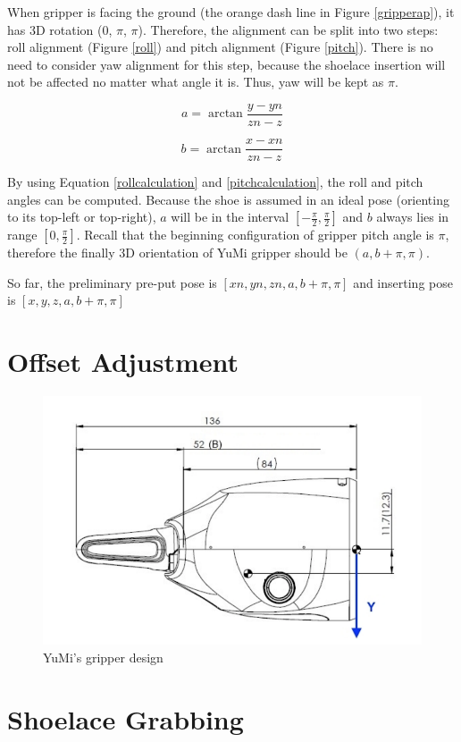 When gripper is facing the ground (the orange dash line in Figure \ref{gripperap}), it has 3D rotation (0, $\pi$, $\pi$). Therefore, the alignment can be split into two steps: roll alignment (Figure \ref{roll}) and pitch alignment (Figure \ref{pitch}). There is no need to consider yaw alignment for this step, because the shoelace insertion will not be affected no matter what angle it is. Thus, yaw will be kept as $\pi$.

\begin{equation}
a = \arctan \frac{y - yn}{zn - z}
\label{rollcalculation}
\end{equation}

\begin{equation}
b = \arctan \frac{x - xn}{zn - z}
\label{pitchcalculation}
\end{equation}

By using Equation \ref{rollcalculation} and \ref{pitchcalculation}, the roll and pitch angles can be computed. Because the shoe is assumed in an ideal pose (orienting to its top-left or top-right), $a$ will be in the interval $[-\frac{\pi}{2}, \frac{\pi}{2}]$ and $b$ always lies in range $[0, \frac{\pi}{2}]$. Recall that the beginning configuration of gripper pitch angle is $\pi$, therefore the finally 3D orientation of YuMi gripper should be $(a, b + \pi, \pi)$. 

So far, the preliminary pre-put pose is $[xn, yn, zn, a, b + \pi, \pi]$ and inserting pose is $[x, y, z, a, b + \pi, \pi]$

\section{Offset Adjustment}

\begin{figure}[H]
\centering
\includegraphics[width = 0.5\columnwidth]{Implementation/mp/gripperoffset.png}
\caption{YuMi's gripper design \citep{Productspecification}}
\label{gripperoffset}
\end{figure}

\section{Shoelace Grabbing}